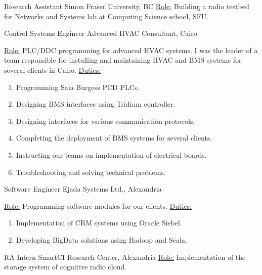 \documentclass[letterpaper]{twentysecondcv} %
\begin{document}
\begin{twenty}
               {Research Assistant}
               {Simon Fraser University, BC}
               {\underline{Role:}\newline
                Building a radio testbed for Networks and Systems lab at Computing Science school, SFU.
               }

               {Control Systems Engineer}
               {Advanced HVAC Consultant, Cairo}
               {\underline{Role:}\newline
                PLC/DDC programming for advanced HVAC systems.
                I was the leader of a team responsible for installing and maintaining HVAC and BMS systems
                for several clients in Cairo.\newline
                \underline{Duties:}
                \begin{enumerate}
                    \item{Programming Saia Burgess PCD PLCs.}
                    \item{Designing BMS interfaces using Tridium controller.}
                    \item{Designing interfaces for various communication protocols.}
                    \item{Completing the deployment of BMS systems for several clients.}
                    \item{Instructing our teams on implementation of electrical boards.}
                    \item{Troubleshooting and solving technical problems.}
                \end{enumerate}
               }

               {Software Engineer}
               {Ejada Systems Ltd., Alexandria}
               {\underline{Role:}\newline
                Programming software modules for our clients.\newline
                \underline{Duties:}
                \begin{enumerate}
                    \item Implementation of CRM systems using Oracle Siebel.
                    \item Developing BigData solutions using Hadoop and Scala.
                \end{enumerate}}

               {RA Intern}
               {SmartCI Research Center, Alexandria}
               {\underline{Role:}\newline 
                Implementation of the storage system of cognitive radio cloud.}

\end{twenty}
\end{document}
